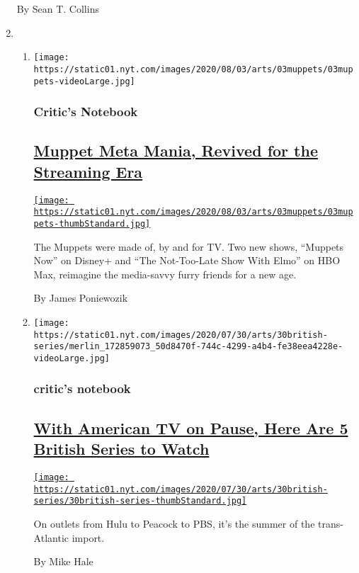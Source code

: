 \begin{enumerate}
  By Sean T. Collins
\item
  \begin{enumerate}
  \def\labelenumii{\arabic{enumii}.}
  \item
    \texttt{[image: https://static01.nyt.com/images/2020/08/03/arts/03muppets/03muppets-videoLarge.jpg]}

    \hypertarget{critics-notebook}{%
    \subsubsection{Critic's Notebook}\label{critics-notebook}}

    \hypertarget{muppet-meta-mania-revived-for-the-streaming-era}{%
    \subsection{\texorpdfstring{\href{/2020/07/31/arts/television/muppets-now.html}{Muppet
    Meta Mania, Revived for the Streaming
    Era}}{Muppet Meta Mania, Revived for the Streaming Era}}\label{muppet-meta-mania-revived-for-the-streaming-era}}

    \href{/2020/07/31/arts/television/muppets-now.html}{\texttt{[image: https://static01.nyt.com/images/2020/08/03/arts/03muppets/03muppets-thumbStandard.jpg]}}

    The Muppets were made of, by and for TV. Two new shows, ``Muppets
    Now'' on Disney+ and ``The Not-Too-Late Show With Elmo'' on HBO Max,
    reimagine the media-savvy furry friends for a new age.

    By James Poniewozik
  \item
    \texttt{[image: https://static01.nyt.com/images/2020/07/30/arts/30british-series/merlin\_172859073\_50d8470f-744c-4299-a4b4-fe38eea4228e-videoLarge.jpg]}

    \hypertarget{critics-notebook-1}{%
    \subsubsection{critic's notebook}\label{critics-notebook-1}}

    \hypertarget{with-american-tv-on-pause-here-are-5-british-series-to-watch}{%
    \subsection{\texorpdfstring{\href{/2020/07/30/arts/television/in-my-skin-hulu.html}{With
    American TV on Pause, Here Are 5 British Series to
    Watch}}{With American TV on Pause, Here Are 5 British Series to Watch}}\label{with-american-tv-on-pause-here-are-5-british-series-to-watch}}

    \href{/2020/07/30/arts/television/in-my-skin-hulu.html}{\texttt{[image: https://static01.nyt.com/images/2020/07/30/arts/30british-series/30british-series-thumbStandard.jpg]}}

    On outlets from Hulu to Peacock to PBS, it's the summer of the
    trans-Atlantic import.

    By Mike Hale
  \end{enumerate}
\end{enumerate}

